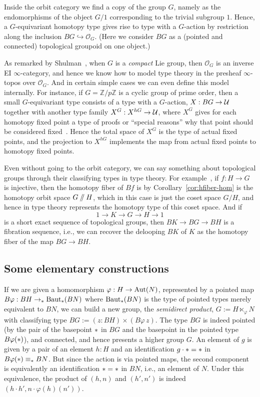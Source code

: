 Inside the orbit category we find a copy of the group $G$, namely as
the endomorphisms of the object $G/1$ corresponding to the trivial
subgroup $1$. Hence, a $G$-equivariant homotopy type gives rise to
type with a $G$-action by restriction along the inclusion $BG
\hookrightarrow \mathcal{O}_G$. (Here we consider $BG$ as a (pointed
and connected) topological groupoid on one object.)

As remarked by Shulman~\cite{ShulmanEI}, when $G$ is a \emph{compact} Lie
group, then $\mathcal{O}_G$ is an inverse EI $\infty$-category, and
hence we know how to model type theory in the presheaf $\infty$-topos
over $\mathcal{O}_G$. And in certain simple cases we can even define
this model internally. For instance, if $G=\mathbb{Z}/p\mathbb{Z}$ is a cyclic group
of prime order, then a small $G$-equivariant type consists of a type with a
$G$-action, $X : BG \to \mathcal{U}$ together with another type family $X^G : X^{hG}
\to \mathcal{U}$, where $X^G$ gives for each homotopy fixed point a type of
proofs or ``special reasons'' why that point should be considered
fixed~\cite[7.6]{ShulmanEI}. Hence the total space of $X^G$ is the
type of actual fixed points,
and the projection to $X^{hG}$ implements the map from actual fixed
points to homotopy fixed points.

Even without going to the orbit category, we can say something about
topological groups through their classifying types in type theory. For
example~\cite{Camarena}, if $f : H \to G$ is injective, then the
homotopy fiber of $Bf$ is by Corollary~\ref{cor:hfiber-hom}
is the homotopy orbit space $G \mathbin{/\kern-3pt/} H$, which in this case is
just the coset space $G/H$, and hence in type
theory represents the homotopy type of this coset space. And if
\[
  1 \to K \to G \to H \to 1
\]
is a short exact sequence of topological groups,
then $BK \to BG \to BH$ is a fibration sequence,
i.e., we can recover the delooping $BK$ of $K$ as the homotopy fiber
of the map $BG \to BH$.

\subsection{Some elementary constructions}
\label{sec:elementary-constructions}

If we are given a homomorphism $\varphi : H \to \operatorname{Aut}(N)$, represented
by a pointed map
$B\varphi : BH \to_\ast \operatorname{Baut}_\ast(BN)$ where $\operatorname{Baut}_\ast(BN)$ is the
type of pointed types merely equivalent to $BN$,
we can build a new group, the
\emph{semidirect product}, $G := H \ltimes_\varphi N$
with classifying type $BG := (z : BH) \times (B\varphi\,z)$.
The type $BG$ is indeed pointed (by the pair of the basepoint $\ast$ in $BG$
and the basepoint in the pointed type $B\varphi(\ast)$), and
connected, and hence presents a higher group $G$.
An element of $g$ is given by a pair of an element $h : H$ and an
identification $g\cdot\ast = \ast$ in $B\varphi(\ast) \equiv_\ast BN$. But
since the action is via pointed maps, the second component is
equivalently an identification $\ast = \ast$ in $BN$, i.e., an element of
$N$. Under this equivalence, the product of $(h,n)$ and $(h',n')$ is
indeed $(h\cdot h', n\cdot \varphi(h)(n'))$.

